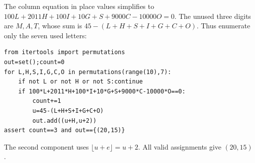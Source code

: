 The column equation in place values simplifies to $ 100L+2011H+100I+10G+S+9000C-10000O=0 $. The unused three digits are $ M,A,T $, whose sum is $ 45-(L+H+S+I+G+C+O)$. Thus enumerate only the seven used letters:
\begin{verbatim}
from itertools import permutations
out=set();count=0
for L,H,S,I,G,C,O in permutations(range(10),7):
    if not L or not H or not S:continue
    if 100*L+2011*H+100*I+10*G+S+9000*C-10000*O==0:
        count+=1
        u=45-(L+H+S+I+G+C+O)
        out.add((u+H,u+2))
assert count==3 and out=={(20,15)}
\end{verbatim}
The second component uses $\lfloor u+e\rfloor=u+2 $. All valid assignments give $\boxed{(20,15)}$.
